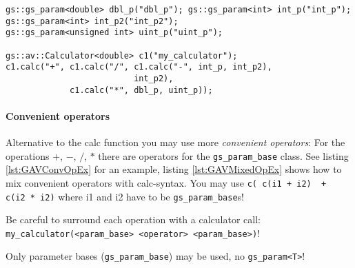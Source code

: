 \noindent
\begin{minipage}{\textwidth}
\begin{lstlisting}[caption={
	Example using the calc-syntax: \newline 
	Calculator type: {\sffamily double}, formula: $(((int\_p - int\_p2) / int\_p2) + (dbl\_p * uint\_p))$.
	}, label=lst:GAVCalcEx2]
gs::gs_param<double> dbl_p("dbl_p"); gs::gs_param<int> int_p("int_p"); 
gs::gs_param<int> int_p2("int_p2");
gs::gs_param<unsigned int> uint_p("uint_p");

gs::av::Calculator<double> c1("my_calculator");
c1.calc("+", c1.calc("/", c1.calc("-", int_p, int_p2), 
                          int_p2), 
             c1.calc("*", dbl_p, uint_p));
\end{lstlisting}
\end{minipage}

\paragraph{Convenient operators}
  Alternative to the calc function you may use more {\em convenient operators}: \newline
  For the operations \colorbox{hellgrau}{$+$}, \colorbox{hellgrau}{$-$}, \colorbox{hellgrau}{$/$}, \colorbox{hellgrau}{$*$} there are operators for the \lstinline|gs_param_base| class. See listing \ref{lst:GAVConvOpEx} for an example, listing \ref{lst:GAVMixedOpEx} shows how to mix convenient operators with calc-syntax. \newline
  You may use \lstinline|c( c(i1 + i2)  +  c(i2 * i2)| where i1 and i2 have to be \lstinline|gs_param_base|s!
    \begin{list}{} {\setlength{\leftmargin}{2.3cm}  \setlength{\labelwidth}{3cm}  }
      \item Be careful to surround each operation with a calculator call: \newline
               \lstinline[language=TeX]|my_calculator(<param_base> <operator> <param_base>)|!
      \item Only parameter bases (\lstinline|gs_param_base|) may be used, \newline 
               no \lstinline|gs_param<T>|!
    \end{list}

